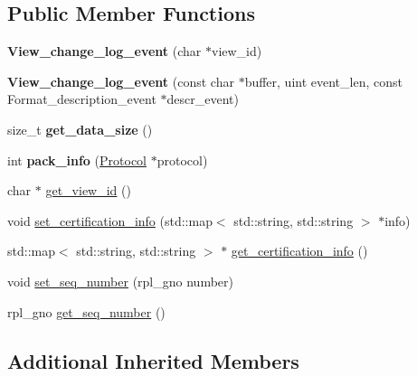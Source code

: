 \subsection*{Public Member Functions}
\begin{DoxyCompactItemize}
\item 
\mbox{\label{classView__change__log__event_a8c88f2a6a33998e72a6ad33f10c62275}} 
{\bfseries View\+\_\+change\+\_\+log\+\_\+event} (char $\ast$view\+\_\+id)
\item 
\mbox{\label{classView__change__log__event_a8a1865a420df3a3d93534aaf33ebc0bb}} 
{\bfseries View\+\_\+change\+\_\+log\+\_\+event} (const char $\ast$buffer, uint event\+\_\+len, const Format\+\_\+description\+\_\+event $\ast$descr\+\_\+event)
\item 
\mbox{\label{classView__change__log__event_a5b5166a39690c13583b9b4f9b4c96672}} 
size\+\_\+t {\bfseries get\+\_\+data\+\_\+size} ()
\item 
\mbox{\label{classView__change__log__event_a4ebb7594cffdda3d8a0ffcdc8f077b42}} 
int {\bfseries pack\+\_\+info} (\mbox{\hyperlink{classProtocol}{Protocol}} $\ast$protocol)
\item 
char $\ast$ \mbox{\hyperlink{classView__change__log__event_a40d99cf5cfd5b2637d9a880eb38bfa7e}{get\+\_\+view\+\_\+id}} ()
\item 
void \mbox{\hyperlink{classView__change__log__event_aba70255c225eed1e9163042ae9621554}{set\+\_\+certification\+\_\+info}} (std\+::map$<$ std\+::string, std\+::string $>$ $\ast$info)
\item 
std\+::map$<$ std\+::string, std\+::string $>$ $\ast$ \mbox{\hyperlink{classView__change__log__event_a2f98b589495213f0d7bbcf21938a1f7a}{get\+\_\+certification\+\_\+info}} ()
\item 
void \mbox{\hyperlink{classView__change__log__event_a557f9b8287dfa7169f528af3330e3e37}{set\+\_\+seq\+\_\+number}} (rpl\+\_\+gno number)
\item 
rpl\+\_\+gno \mbox{\hyperlink{classView__change__log__event_ac20c18e4ed6439f1cc2c28631112de2f}{get\+\_\+seq\+\_\+number}} ()
\end{DoxyCompactItemize}
\subsection*{Additional Inherited Members}


